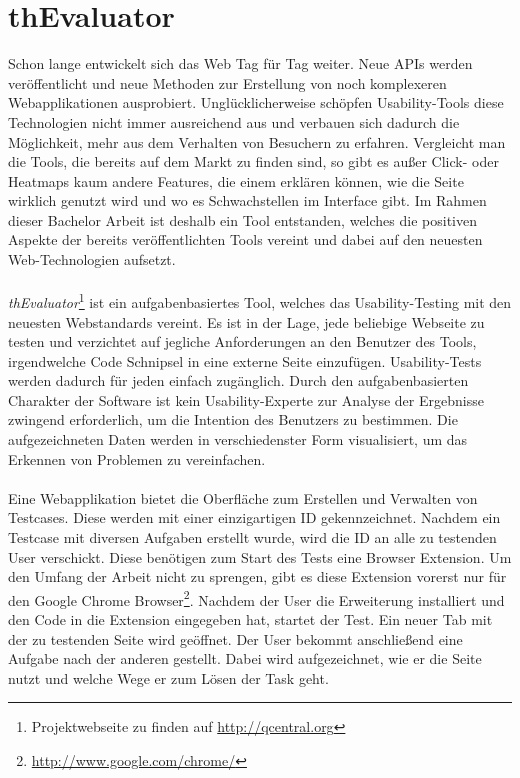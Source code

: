 %
%
%
%

\chapter{thEvaluator}

Schon lange entwickelt sich das Web Tag für Tag weiter. Neue APIs werden veröffentlicht und neue Methoden zur Erstellung von noch komplexeren Webapplikationen ausprobiert. Unglücklicherweise schöpfen Usability-Tools diese Technologien nicht immer ausreichend aus und verbauen sich dadurch die Möglichkeit, mehr aus dem Verhalten von Besuchern zu erfahren. Vergleicht man die Tools, die bereits auf dem Markt zu finden sind, so gibt es außer Click- oder Heatmaps kaum andere Features, die einem erklären können, wie die Seite wirklich genutzt wird und wo es Schwachstellen im Interface gibt. Im Rahmen dieser Bachelor Arbeit ist deshalb ein Tool entstanden, welches die positiven Aspekte der bereits veröffentlichten Tools vereint und dabei auf den neuesten Web-Technologien aufsetzt.\\
\\
\textit{thEvaluator}\footnote{Projektwebseite zu finden auf \url{http://qcentral.org}} ist ein aufgabenbasiertes Tool, welches das Usability-Testing mit den neuesten Webstandards vereint. Es ist in der Lage, jede beliebige Webseite zu testen und verzichtet auf jegliche Anforderungen an den Benutzer des Tools, irgendwelche Code Schnipsel in eine externe Seite einzufügen. Usability-Tests werden dadurch für jeden einfach zugänglich. Durch den aufgabenbasierten Charakter der Software ist kein Usability-Experte zur Analyse der Ergebnisse zwingend erforderlich, um die Intention des Benutzers zu bestimmen. Die aufgezeichneten Daten werden in verschiedenster Form visualisiert, um das Erkennen von Problemen zu vereinfachen.\\
\\
Eine Webapplikation bietet die Oberfläche zum Erstellen und Verwalten von Testcases. Diese werden mit einer einzigartigen ID gekennzeichnet. Nachdem ein Testcase mit diversen Aufgaben erstellt wurde, wird die ID an alle zu testenden User verschickt. Diese benötigen zum Start des Tests eine Browser Extension. Um den Umfang der Arbeit nicht zu sprengen, gibt es diese Extension vorerst nur für den Google Chrome Browser\footnote{\url{http://www.google.com/chrome/}}. Nachdem der User die Erweiterung installiert und den Code in die Extension eingegeben hat, startet der Test. Ein neuer Tab mit der zu testenden Seite wird geöffnet. Der User bekommt anschließend eine Aufgabe nach der anderen gestellt. Dabei wird aufgezeichnet, wie er die Seite nutzt und welche Wege er zum Lösen der Task geht.







